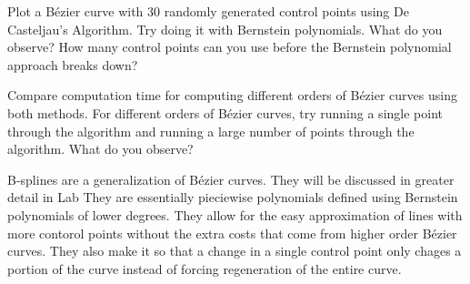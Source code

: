 \begin{problem}
Plot a B\'{e}zier curve with 30 randomly generated control points using De Casteljau's Algorithm.
Try doing it with Bernstein polynomials.
What do you observe?
How many control points can you use before the Bernstein polynomial approach breaks down?

Compare computation time for computing different orders of B\'{e}zier curves using both methods.
For different orders of B\'{e}zier curves, try running a single point through the algorithm and running a large number of points through the algorithm.
What do you observe?
\end{problem}

B-splines are a generalization of B\'{e}zier curves.
They will be discussed in greater detail in Lab 
They are essentially pieciewise polynomials defined using Bernstein polynomials of lower degrees.
They allow for the easy approximation of lines with more contorol points without the extra costs that come from higher order B\'{e}zier curves.
They also make it so that a change in a single control point only chages a portion of the curve instead of forcing regeneration of the entire curve.
